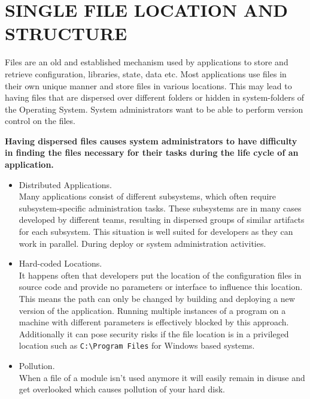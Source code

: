 \newpage
\section*{SINGLE FILE LOCATION AND STRUCTURE}
Files are an old and established mechanism used by applications to store and retrieve configuration, libraries, state, data etc. Most applications use files in their own unique manner and store files in various locations. This may lead to having files that are dispersed over different folders or hidden in system-folders of the Operating System. System administrators  want to be able to perform version control on the files.
\begin{center}
  
\end{center}

\textbf{Having dispersed files causes system administrators to have difficulty in finding the files necessary for their tasks during the life cycle of an application.}\\

\begin{itemize}
\item Distributed Applications.\\
Many applications consist of different subsystems, which often require  subsystem-specific administration tasks. These subsystems are in many cases developed by different teams, resulting in dispersed groups of similar artifacts for each subsystem. This situation is well suited for developers as they can work in parallel. During deploy or system administration activities.
\item Hard-coded Locations.\\
It happens often that developers put the location of the configuration files in source code and provide no parameters or interface to influence this location. This means the path can only be changed by building and deploying a new version of the application. Running multiple instances of a program on a machine with different parameters is effectively blocked by this approach. Additionally it can pose security risks if the file location is in a privileged location such as \verb|C:\Program Files| for Windows based systems.
\item Pollution.\\
When a file of a module isn't used anymore it will easily remain in disuse and get overlooked which causes pollution of your hard disk.\\
\end{itemize}

